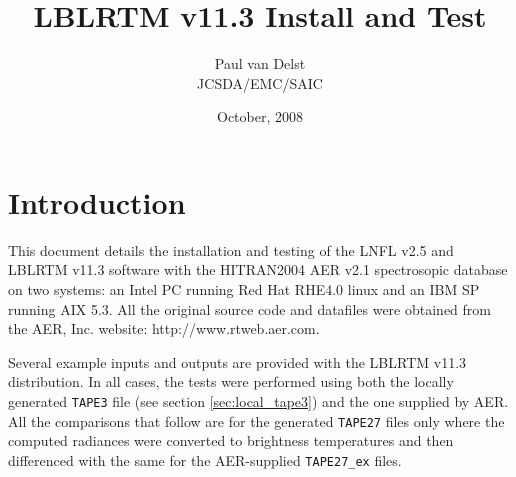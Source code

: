 




\title{LBLRTM v11.3 Install and Test}
\author{Paul van Delst\\JCSDA/EMC/SAIC}
\date{October, 2008}



\maketitle

\draftwatermark


\section{Introduction}
This document details the installation and testing of the LNFL v2.5 and LBLRTM v11.3 software with the HITRAN2004 AER v2.1 spectrosopic database on two systems: an Intel PC running Red Hat RHE4.0 linux and an IBM SP running AIX 5.3. All the original source code and datafiles were obtained from the AER, Inc. website: http://www.rtweb.aer.com.

Several example inputs and outputs are provided with the LBLRTM v11.3 distribution. In all cases, the tests were performed using both the locally generated \texttt{TAPE3} file (see section \ref{sec:local_tape3}) and the one supplied by AER. All the comparisons that follow are for the generated \texttt{TAPE27} files only where the computed radiances were converted to brightness temperatures and then differenced with the same for the AER-supplied \texttt{TAPE27\_ex} files.








\begin{appendix}
  
\end{appendix}



